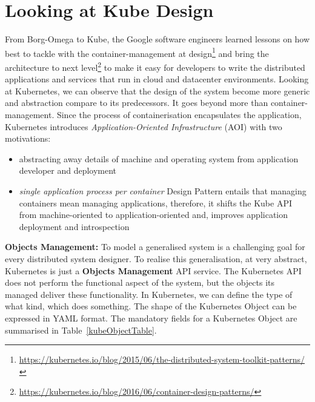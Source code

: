 \section{Looking at Kube Design}
\label{kubeDesign}
From Borg-Omega to Kube, the Google software engineers learned lessons\parencite{44843} on how best to tackle with the container-management at design\footnote{\url{https://kubernetes.io/blog/2015/06/the-distributed-system-toolkit-patterns/}} and bring the architecture to next level\footnote{\url{https://kubernetes.io/blog/2016/06/container-design-patterns/}} to make it easy for developers to write the distributed applications and services that run in cloud and datacenter environments. Looking at Kubernetes, we can observe that the design of the system become more generic and abstraction compare to its predecessors. It goes beyond more than container-management. Since the process of containerisation encapsulates the application, Kubernetes introduces \textit{Application-Oriented Infrastructure} (AOI) with two motivations:
\begin{itemize}
\item abstracting away details of machine and operating system from application developer and deployment
\item \emph{single application process per container} Design Pattern entails that managing containers mean managing applications, therefore, it shifts the Kube API from machine-oriented to application-oriented and, improves application deployment and introspection 
\end{itemize}

\noindent\textbf{Objects Management:} \quad To model a generalised system is a challenging goal for every distributed system designer. To realise this generalisation, at very abstract, Kubernetes is just a \textbf{Objects Management} API service. The Kubernetes API does not perform the functional aspect of the system, but the objects its managed deliver these functionality. In Kubernetes, we can define the type of what kind, which does something. The shape of the Kubernetes Object can be expressed in YAML format. The mandatory fields for a Kubernetes Object are summarised in Table~\ref{kubeObjectTable}.

